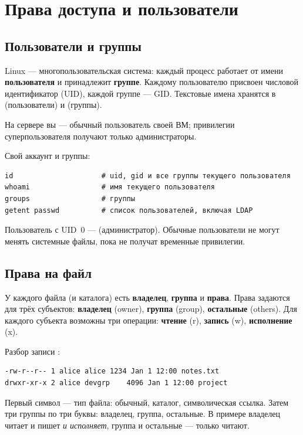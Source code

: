 \chapter{Права доступа и пользователи}
\label{ch:05-permissions}

\section{Пользователи и группы}

Linux --- многопользовательская система: каждый процесс работает от
имени \textbf{пользователя} и принадлежит \textbf{группе}. Каждому
пользователю присвоен числовой идентификатор (UID), каждой группе ---
GID. Текстовые имена хранятся в  (пользователи)
и  (группы).

На сервере  вы --- обычный пользователь своей ВМ;
привилегии суперпользователя получают только администраторы.

Свой аккаунт и группы:
\begin{verbatim}
id                     # uid, gid и все группы текущего пользователя
whoami                 # имя текущего пользователя
groups                 # группы
getent passwd          # список пользователей, включая LDAP
\end{verbatim}

Пользователь с UID~0 ---  (администратор). Обычные
пользователи не могут менять системные файлы, пока не получат
временные привилегии.

\section{Права на файл}

У каждого файла (и каталога) есть \textbf{владелец},
\textbf{группа} и \textbf{права}. Права задаются для трёх субъектов:
\textbf{владелец} (owner), \textbf{группа} (group),
\textbf{остальные} (others). Для каждого субъекта возможны
три операции: \textbf{чтение} (r), \textbf{запись} (w),
\textbf{исполнение} (x).

Разбор записи :
\begin{verbatim}
-rw-r--r-- 1 alice alice 1234 Jan 1 12:00 notes.txt
drwxr-xr-x 2 alice devgrp    4096 Jan 1 12:00 project
\end{verbatim}

Первый символ --- тип файла: \cmd{-} обычный,  каталог,
 символическая ссылка. Затем три группы по три буквы:
владелец, группа, остальные. В примере владелец читает и пишет
\emph{и исполняет}, группа и остальные --- только читают.

